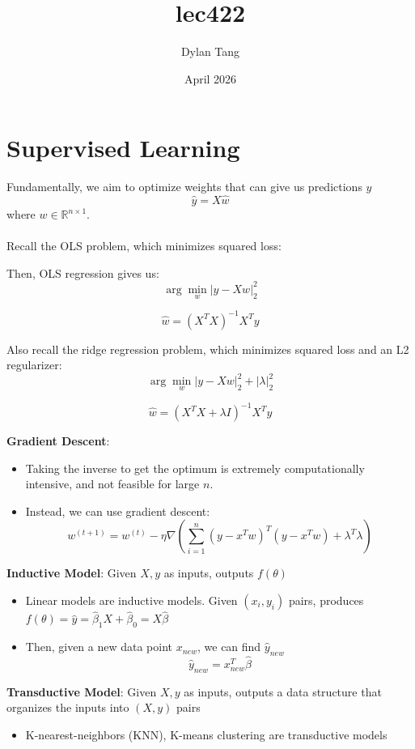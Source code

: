 \documentclass{article}
\title{lec422}
\author{Dylan Tang}
\date{April 2026}
\begin{document}
\maketitle

\section{Supervised Learning}
Fundamentally, we aim to optimize weights that can give us predictions $\hat{y}$
\[
    \hat{y} = X\hat{w}
\]
where $w \in \mathbb{R}^{n \times 1}$.
\\
\\
Recall the OLS problem, which minimizes squared loss:

Then, OLS regression gives us:
\[
    \arg\min_w |y - Xw|_2^2 
\]

\[
    \hat{w} = (X^TX)^{-1}X^Ty
\]

Also recall the ridge regression problem, which minimizes squared loss and an L2 regularizer:
\[
    \arg\min_w |y - Xw|_2^2  + |\lambda|^2_2
\]

\[
    \hat{w} = (X^TX + \lambda I)^{-1}X^Ty
\]

\textbf{Gradient Descent}:
\begin{itemize}
    \item Taking the inverse to get the optimum is extremely computationally intensive, and not feasible for large $n$.
    \item Instead, we can use gradient descent:
    \[
        w^{(t+1)} = w^{(t)} - \eta\nabla(\sum_{i = 1}^n (y- x^Tw)^T(y-x^Tw) + \lambda^T\lambda)
    \]
\end{itemize}

\textbf{Inductive Model}: Given $X, y$ as inputs, outputs $f(\theta)$
\begin{itemize}
    \item Linear models are inductive models. Given $(x_i, y_i)$ pairs, produces $f(\theta) = \hat{y} = \hat{\beta}_1X + \hat{\beta}_0 = X\hat{\beta}$
    \item Then, given a new data point $x_{new}$, we can find $\hat{y}_{new}$
    \[
        \hat{y}_{new} = x_{new}^T\hat{\beta}
    \]
\end{itemize}

\textbf{Transductive Model}: Given $X, y$ as inputs, outputs a data structure that organizes the inputs into $(X,y)$ pairs
\begin{itemize}
    \item K-nearest-neighbors (KNN), K-means clustering are transductive models
\end{itemize}
\end{document}
